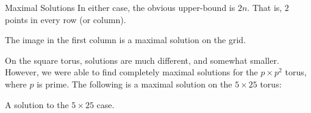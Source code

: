 \documentclass[12pt,serif,mathserif,final]{beamer}
\begin{document}
\begin{frame}[t]
\begin{columns}[t]
\begin{column}{0.32\linewidth}
      \begin{block}{Maximal Solutions}
        In either case, the obvious upper-bound is $2n$.  That is,
        $2$ points in every row (or column).

        The image in the first column is a maximal solution on the grid.

        On the square torus, solutions are much different, and somewhat smaller.
        However, we were able to find completely maximal solutions for the 
        $p \times p^2$ torus, where $p$ is prime.  The following is a maximal 
        solution on the $5\times 25$ torus:
        \begin{center}

            A solution to the $5\times 25$ case.
        \end{center}
      \end{block}

    \end{column}%

  \end{columns}
  \begin{center}
  \end{center}
\end{frame}
\end{document}
